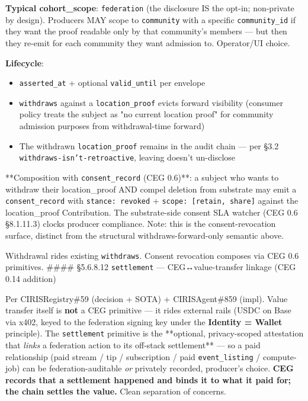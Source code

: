 \documentclass[11pt]{article}
\begin{document}
\textbf{Typical cohort\_scope}: \texttt{federation} (the disclosure IS the opt-in; non-private by design). Producers MAY scope to \texttt{community} with a specific \texttt{community\_id} if they want the proof readable only by that community's members — but then they re-emit for each community they want admission to. Operator/UI choice.


\textbf{Lifecycle}:


\begin{itemize}\setlength\itemsep{0pt}
\item \texttt{asserted\_at} + optional \texttt{valid\_until} per envelope
\item \texttt{withdraws} against a \texttt{location\_proof} evicts forward visibility (consumer policy treats the subject as "no current location proof" for community admission purposes from withdrawal-time forward)
\item The withdrawn \texttt{location\_proof} remains in the audit chain — per §3.2 \texttt{withdraws-isn't-retroactive}, leaving doesn't un-disclose
\end{itemize}


**Composition with \texttt{consent\_record} (CEG 0.6)**: a subject who wants to withdraw their location\_proof AND compel deletion from substrate may emit a \texttt{consent\_record} with \texttt{stance: revoked} + \texttt{scope: [retain, share]} against the location\_proof Contribution. The substrate-side consent SLA watcher (CEG 0.6 §8.1.11.3) clocks producer compliance. Note: this is the consent-revocation surface, distinct from the structural withdraws-forward-only semantic above.


Withdrawal rides existing \texttt{withdraws}. Consent revocation composes via CEG 0.6 primitives. \#\#\#\# §5.6.8.12 \texttt{settlement} — CEG↔value-transfer linkage (CEG 0.14 addition)


Per CIRISRegistry\#59 (decision + SOTA) + CIRISAgent\#859 (impl). Value transfer itself is \textbf{not} a CEG primitive — it rides external rails (USDC on Base via x402, keyed to the federation signing key under the \textbf{Identity = Wallet} principle). The \texttt{settlement} primitive is the **optional, privacy-scoped attestation that \textit{links} a federation action to its off-stack settlement** — so a paid relationship (paid stream / tip / subscription / paid \texttt{event\_listing} / compute-job) can be federation-auditable \textit{or} privately recorded, producer's choice. \textbf{CEG records that a settlement happened and binds it to what it paid for; the chain settles the value.} Clean separation of concerns.
\end{document}
